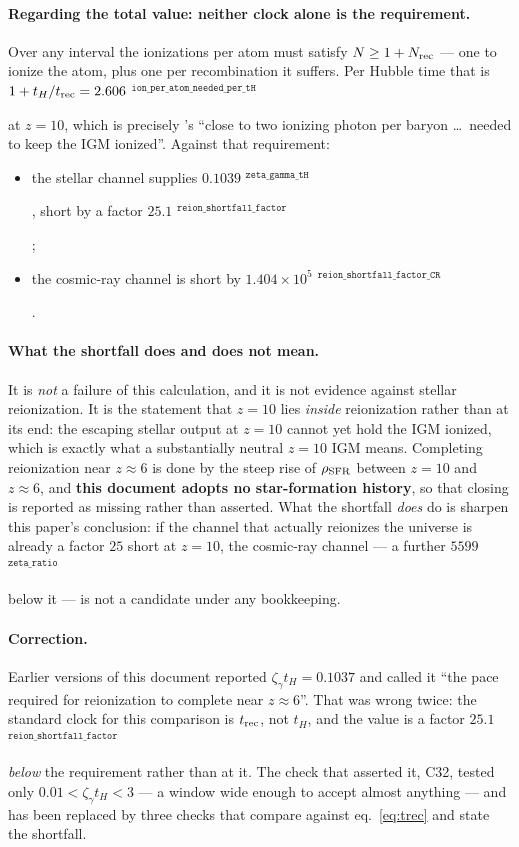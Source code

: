 \documentclass[11pt,a4paper]{article}
\newif\ifprovdraft
\newcommand{\src}[1]{%
  \ifprovdraft
    \ifmmode{}^{\text{\color{gray}\scriptsize\texttt{#1}}}%
    \else{\color{gray}\scriptsize$^{\texttt{#1}}$}%
    \fi
  \fi}
\begin{document}
\paragraph{Regarding the total value: neither clock alone is the requirement.}
Over any interval the ionizations per atom must satisfy $N \ge 1 + N_{\rm rec}$
--- one to ionize the atom, plus one per recombination it suffers. Per Hubble
time that is $1 + t_H/t_{\rm rec} =
2.606$\src{ion\_per\_atom\_needed\_per\_tH} at $z=10$, which is precisely
\cite{md14}'s ``close to two ionizing photon per baryon \dots\ needed to keep
the IGM ionized''. Against that requirement:
\begin{itemize}\itemsep2pt
\item the stellar channel supplies $0.1039$\src{zeta\_gamma\_tH}, short by a
      factor $25.1$\src{reion\_shortfall\_factor};
\item the cosmic-ray channel is short by
      $1.404\times10^{5}$\src{reion\_shortfall\_factor\_CR}.
\end{itemize}

\paragraph{What the shortfall does and does not mean.} It is \emph{not} a
failure of this calculation, and it is not evidence against stellar
reionization. It is the statement that $z=10$ lies \emph{inside} reionization
rather than at its end: the escaping stellar output at $z=10$ cannot yet hold
the IGM ionized, which is exactly what a substantially neutral $z=10$ IGM
means. Completing reionization near $z\approx6$ is done by the steep rise of
$\rho_{\rm SFR}$ between $z=10$ and $z\approx6$, and \textbf{this document
adopts no star-formation history}, so that closing is reported as missing
rather than asserted. What the shortfall \emph{does} do is sharpen this paper's
conclusion: if the channel that actually reionizes the universe is already a
factor $25$ short at $z=10$, the cosmic-ray channel --- a further
$5599$\src{zeta\_ratio} below it --- is not a candidate under any bookkeeping.

\paragraph{Correction.} Earlier versions of this document reported
$\zeta_\gamma t_H = 0.1037$ and called it ``the pace required for reionization
to complete near $z\approx6$''. That was wrong twice: the standard clock for
this comparison is $t_{\rm rec}$, not $t_H$, and the value is a factor
$25.1$\src{reion\_shortfall\_factor} \emph{below} the requirement rather than
at it. The check that asserted it, C32, tested only $0.01 < \zeta_\gamma t_H <
3$ --- a window wide enough to accept almost anything --- and has been replaced
by three checks that compare against eq.~\eqref{eq:trec} and state the
shortfall.
\end{document}
